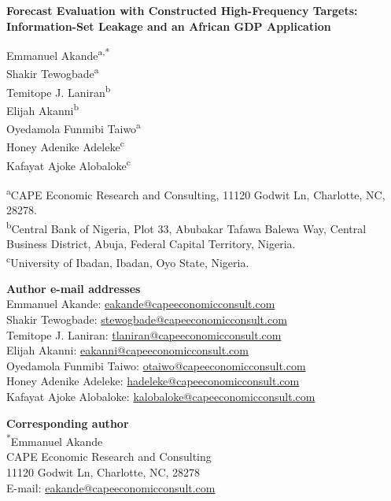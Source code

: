 \documentclass[12pt]{article}
\begin{document}
\begin{center}
{\Large\bfseries Forecast Evaluation with Constructed High-Frequency Targets: Information-Set Leakage and an African GDP Application\par}
\vspace{0.7cm}
Emmanuel Akande\textsuperscript{a,*}\\
Shakir Tewogbade\textsuperscript{a}\\
Temitope J. Laniran\textsuperscript{b}\\
Elijah Akanni\textsuperscript{b}\\
Oyedamola Funmibi Taiwo\textsuperscript{a}\\
Honey Adenike Adeleke\textsuperscript{c}\\
Kafayat Ajoke Alobaloke\textsuperscript{c}
\end{center}
\vspace{0.4cm}
\textsuperscript{a}CAPE Economic Research and Consulting, 11120 Godwit Ln, Charlotte, NC, 28278.\\
\textsuperscript{b}Central Bank of Nigeria, Plot 33, Abubakar Tafawa Balewa Way, Central Business District, Abuja, Federal Capital Territory, Nigeria.\\
\textsuperscript{c}University of Ibadan, Ibadan, Oyo State, Nigeria.

\textbf{Author e-mail addresses}\\
Emmanuel Akande: \href{mailto:eakande@capeeconomicconsult.com}{eakande@capeeconomicconsult.com}\\
Shakir Tewogbade: \href{mailto:stewogbade@capeeconomicconsult.com}{stewogbade@capeeconomicconsult.com}\\
Temitope J. Laniran: \href{mailto:tlaniran@capeeconomicconsult.com}{tlaniran@capeeconomicconsult.com}\\
Elijah Akanni: \href{mailto:eakanni@capeeconomicconsult.com}{eakanni@capeeconomicconsult.com}\\
Oyedamola Funmibi Taiwo: \href{mailto:otaiwo@capeeconomicconsult.com}{otaiwo@capeeconomicconsult.com}\\
Honey Adenike Adeleke: \href{mailto:hadeleke@capeeconomicconsult.com}{hadeleke@capeeconomicconsult.com}\\
Kafayat Ajoke Alobaloke: \href{mailto:kalobaloke@capeeconomicconsult.com}{kalobaloke@capeeconomicconsult.com}

\textbf{Corresponding author}\\
\textsuperscript{*}Emmanuel Akande\\
CAPE Economic Research and Consulting\\
11120 Godwit Ln, Charlotte, NC, 28278\\
E-mail: \href{mailto:eakande@capeeconomicconsult.com}{eakande@capeeconomicconsult.com}
\end{document}
